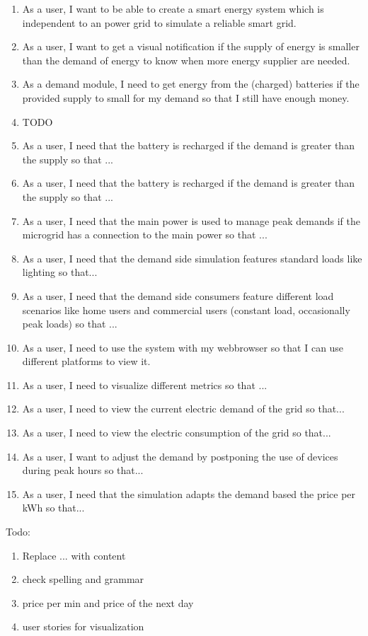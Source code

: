 \begin{enumerate}
\item As a user, I want to be able to create a smart energy system which is independent to an power grid to simulate a reliable smart grid.

\item As a user, I want to get a visual notification if the supply of energy is smaller than the demand of energy to know when more energy supplier are needed.

\item As a demand module, I need to get energy from the (charged) batteries if the provided supply to small for my demand so that I still have enough money. 

\item TODO
\item As a user, I need that the battery is recharged if the demand is greater than the supply so that ...

\item As a user, I need that the battery is recharged if the demand is greater than the supply so that ...

\item As a user, I need that the main power is used to manage peak demands if the microgrid has a connection to the main power so that ...

\item As a user, I need that the demand side simulation features standard loads like lighting so that...

\item As a user, I need that the demand side consumers feature different load scenarios like home users and commercial users (constant load, occasionally peak loads) so that ...

\item As a user, I need to use the system with my webbrowser so that I can use different platforms to view it.

\item As a user, I need to visualize different metrics so that ...

\item As a user, I need to view the current electric demand of the grid so that...

\item As a user, I need to view the electric consumption of the grid so that...

\item As a user, I want to adjust the demand by postponing the use of devices during peak hours so that...

\item As a user, I need that the simulation adapts the demand based the price per kWh so that...



\end{enumerate}
Todo:\\
\begin{enumerate}
	\item Replace ... with content
	\item check spelling and grammar
	\item price per min and price of the next day
	\item user stories for visualization
\end{enumerate}


